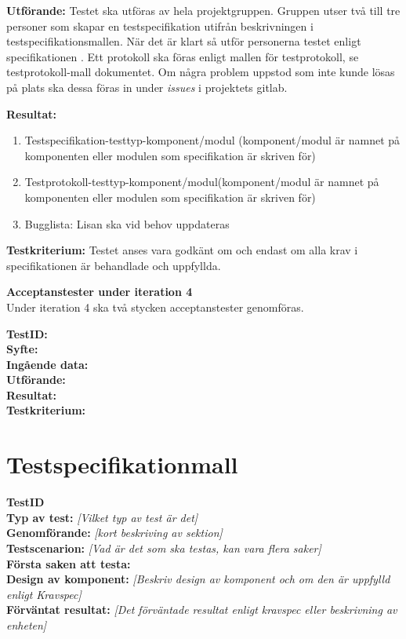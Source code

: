 \documentclass[a4paper,10pt, twoside]{article}
\begin{document}
\textbf{Utförande:} Testet ska utföras av hela projektgruppen. Gruppen utser två till tre personer som skapar en testspecifikation utifrån beskrivningen i
testspecifikationsmallen. När det är klart så utför personerna testet enligt specifikationen \cite{kravspec}. Ett protokoll ska föras enligt mallen för
testprotokoll, se testprotokoll-mall dokumentet. Om några problem uppstod som inte kunde lösas på plats ska dessa föras in under \emph{issues} i projektets
gitlab.

\textbf{Resultat:}
\begin{enumerate}
	\item \label{itm:Testspecifikation-a} Testspecifikation-testtyp-komponent/modul (komponent/modul är namnet på komponenten eller modulen som 					specifikation är skriven för)
    \item \label{itm:Testprotokoll-a} Testprotokoll-testtyp-komponent/modul(komponent/modul är namnet på komponenten eller modulen som
        specifikation är skriven för)
    \item Bugglista: Lisan ska vid behov uppdateras
\end{enumerate}

\textbf{Testkriterium:} Testet anses vara godkänt om och endast om alla krav i specifikationen är behandlade och uppfyllda.
\clearpage

\textbf{Acceptanstester under iteration 4}
\\ Under iteration 4 ska två stycken acceptanstester genomföras.

\textbf{TestID:}
  \\ \textbf{Syfte:}
  \\ \textbf{Ingående data:}
  \\ \textbf{Utförande:}
  \\ \textbf{Resultat:}
  \\ \textbf{Testkriterium:}

\printbibliography

\newpage

\appendix
\section{Testspecifikationmall}
\label{sec: Testspecifikationmall}

   \textbf{TestID}
\\ \textbf{Typ av test:} \emph{[Vilket typ av test är det]}
\\ \textbf{Genomförande:} \emph{[kort beskriving av sektion]}
\\ \textbf{Testscenarion:} \emph{[Vad är det som ska testas, kan vara flera saker]}
\\ \textbf{Första saken att testa:}
\\ \textbf{Design av komponent:} \emph{[Beskriv design av komponent och om den är uppfylld enligt Kravspec]}
\\ \textbf{Förväntat resultat:} \emph{[Det förväntade resultat enligt kravspec eller beskrivning av enheten]}
\end{document}
